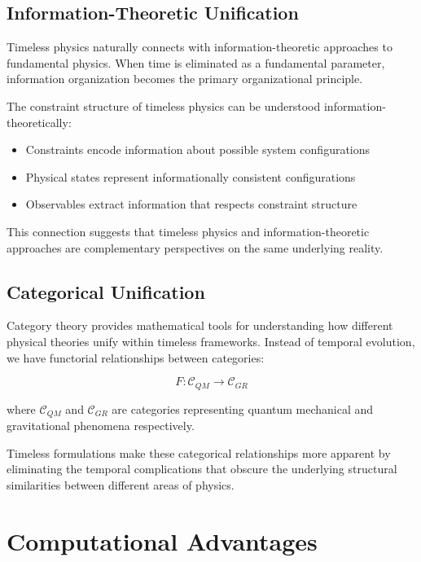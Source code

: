\documentclass[12pt]{article}
\begin{document}
\subsection{Information-Theoretic Unification}

Timeless physics naturally connects with information-theoretic approaches to fundamental physics. When time is eliminated as a fundamental parameter, information organization becomes the primary organizational principle.

The constraint structure of timeless physics can be understood information-theoretically:
\begin{itemize}
\item Constraints encode information about possible system configurations
\item Physical states represent informationally consistent configurations
\item Observables extract information that respects constraint structure
\end{itemize}

This connection suggests that timeless physics and information-theoretic approaches are complementary perspectives on the same underlying reality.

\subsection{Categorical Unification}

Category theory provides mathematical tools for understanding how different physical theories unify within timeless frameworks. Instead of temporal evolution, we have functorial relationships between categories:

\begin{equation}
F: \mathcal{C}_{QM} \to \mathcal{C}_{GR}
\end{equation}

where $\mathcal{C}_{QM}$ and $\mathcal{C}_{GR}$ are categories representing quantum mechanical and gravitational phenomena respectively.

Timeless formulations make these categorical relationships more apparent by eliminating the temporal complications that obscure the underlying structural similarities between different areas of physics.

\section{Computational Advantages}
\end{document}
